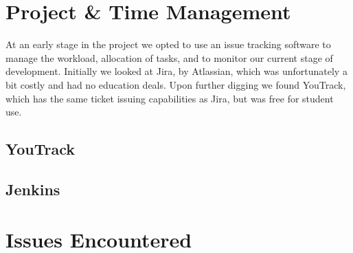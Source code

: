 \section{Project \& Time Management}
At an early stage in the project we opted to use an issue tracking software to manage the workload, allocation of tasks, and to monitor our current stage of development.
Initially we looked at Jira, by Atlassian, which was unfortunately a bit costly and had no education deals. Upon further digging we found YouTrack, which has the same ticket issuing capabilities as Jira, but was free for student use.
\subsection{YouTrack}
\subsection{Jenkins}
\section{Issues Encountered}